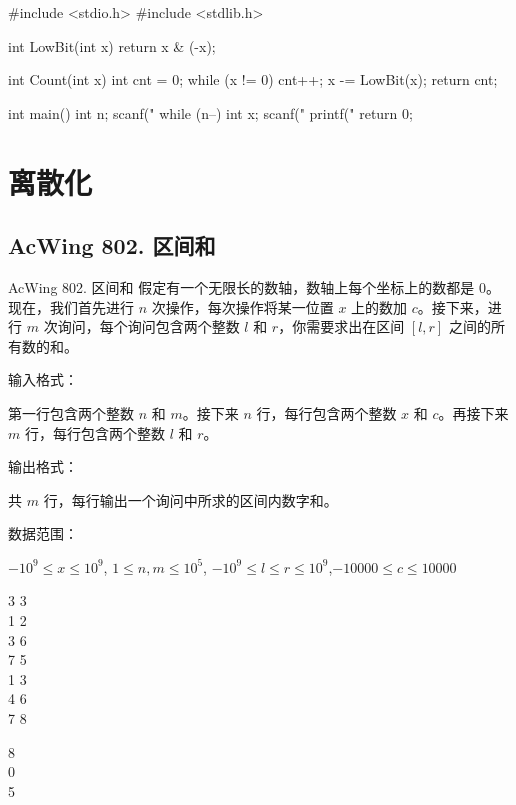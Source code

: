 \begin{mycpptwocol}[LowBit 运算]
    #include <stdio.h>
    #include <stdlib.h>

    int LowBit(int x) {
        return x & (-x);
    }

    int Count(int x) {
        int cnt = 0;
        while (x != 0) {
            cnt++;
            x -= LowBit(x);
        }
        return cnt;
    }

    int main() {
        int n;
        scanf("%
        while (n--) {
            int x;
            scanf("%
            printf("%
        }
        return 0;
    }
\end{mycpptwocol}


\section{离散化}

\subsection{AcWing 802. 区间和}
\begin{titledbox}{AcWing 802. 区间和}
    假定有一个无限长的数轴，数轴上每个坐标上的数都是 $0$。现在，我们首先进行 $n$ 次操作，每次操作将某一位置 $x$ 上的数加 $c$。接下来，进行 $m$ 次询问，每个询问包含两个整数 $l$ 和 $r$，你需要求出在区间 $[l, r]$ 之间的所有数的和。

    输入格式：

    第一行包含两个整数 $n$ 和 $m$。接下来 $n$ 行，每行包含两个整数 $x$ 和 $c$。再接下来 $m$ 行，每行包含两个整数 $l$ 和 $r$。

    输出格式：

    共 $m$ 行，每行输出一个询问中所求的区间内数字和。

    数据范围：

    $-10^9 \le x \le 10^9$, $1 \le n,m \le 10^5$, $-10^9 \le l \le r \le 10^9$,$-10000 \le c \le 10000$

    \begin{inputblock}
        3 3 \\
        1 2 \\
        3 6 \\
        7 5 \\
        1 3 \\
        4 6 \\
        7 8
    \end{inputblock}
    \begin{outputblock}
        8 \\
        0 \\
        5
    \end{outputblock}
\end{titledbox}


